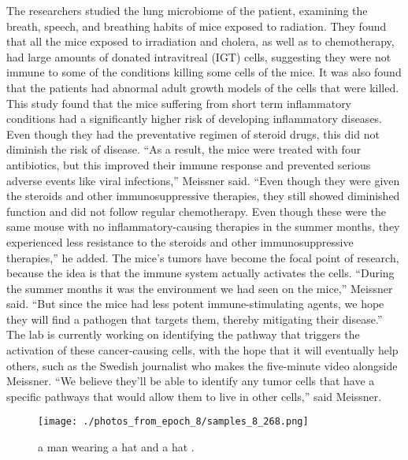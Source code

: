 \documentclass{article}%
\begin{document}
The researchers studied the lung microbiome of the patient, examining the breath, speech, and breathing habits of mice exposed to radiation. They found that all the mice exposed to irradiation and cholera, as well as to chemotherapy, had large amounts of donated intravitreal (IGT) cells, suggesting they were not immune to some of the conditions killing some cells of the mice. It was also found that the patients had abnormal adult growth models of the cells that were killed.\newline%
This study found that the mice suffering from short term inflammatory conditions had a significantly higher risk of developing inflammatory diseases. Even though they had the preventative regimen of steroid drugs, this did not diminish the risk of disease.\newline%
“As a result, the mice were treated with four antibiotics, but this improved their immune response and prevented serious adverse events like viral infections,” Meissner said. “Even though they were given the steroids and other immunosuppressive therapies, they still showed diminished function and did not follow regular chemotherapy. Even though these were the same mouse with no inflammatory{-}causing therapies in the summer months, they experienced less resistance to the steroids and other immunosuppressive therapies,” he added.\newline%
The mice’s tumors have become the focal point of research, because the idea is that the immune system actually activates the cells.\newline%
“During the summer months it was the environment we had seen on the mice,” Meissner said. “But since the mice had less potent immune{-}stimulating agents, we hope they will find a pathogen that targets them, thereby mitigating their disease.”\newline%
The lab is currently working on identifying the pathway that triggers the activation of these cancer{-}causing cells, with the hope that it will eventually help others, such as the Swedish journalist who makes the five{-}minute video alongside Meissner.\newline%
“We believe they’ll be able to identify any tumor cells that have a specific pathways that would allow them to live in other cells,” said Meissner.\newline%

%


\begin{figure}[h!]%
\centering%
\texttt{[image: ./photos\_from\_epoch\_8/samples\_8\_268.png]}%
\caption{a man wearing a hat and a hat .}%
\end{figure}

%
\end{document}

